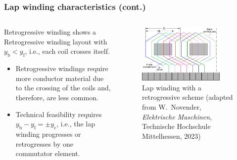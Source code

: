 \begin{frame}
	\frametitle{Lap winding characteristics (cont.)}
    \begin{columns}
		\begin{column}{0.42\textwidth}
			\begin{varblock}{Retrogressive winding}
				 shows a Retrogressive winding layout with $y_\mathrm{b} < y_\mathrm{f}$, i.e., each coil crosses itself.
			\end{varblock}
			\begin{itemize}
				\item<2-> Retrogressive windings require more conductor material due to the crossing of the coils and, therefore, are less common.
				\item<3-> Technical feasibility requires $y_\mathrm{b} - y_\mathrm{f} = \pm y_\mathrm{c}$, i.e., the lap winding progresses or retrogresses by one commutator element.
			\end{itemize}
		\end{column}
        \hfill
		\begin{column}{0.55\textwidth}
			\begin{figure}
				\centering
				\includegraphics[width=0.85\textwidth]{fig/lec03/Lap_winding_distances_retrogressive.pdf}
				\caption{Lap winding with a retrogressive scheme (adapted from W.~Novender, \textit{Elektrische Maschinen}, Technische Hochschule Mittelhessen, 2023)}
				\label{fig:Lap_winding_distances_retrogressive}
			\end{figure}
		\end{column}
		\end{columns}
\end{frame}


